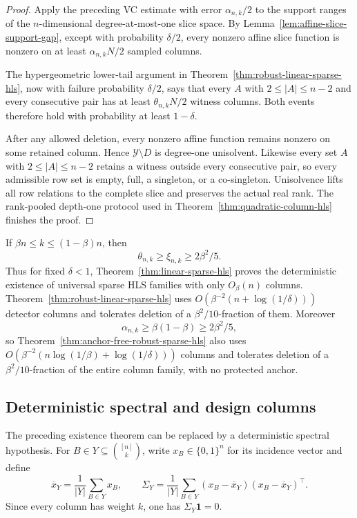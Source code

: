 \documentclass[11pt]{article}
\theoremstyle{definition}
\theoremstyle{remark}
\newcommand{\cY}{\mathcal Y}
\newcommand{\1}{\mathbf 1}
\begin{document}
\begin{proof}
Apply the preceding VC estimate with error $\alpha_{n,k}/2$ to the support
ranges of the $n$-dimensional degree-at-most-one slice space.  By
Lemma~\ref{lem:affine-slice-support-gap}, except with probability
$\delta/2$, every nonzero affine slice function is nonzero on at least
$\alpha_{n,k}N/2$ sampled columns.

The hypergeometric lower-tail argument in
Theorem~\ref{thm:robust-linear-sparse-hls}, now with failure probability
$\delta/2$, says that every $A$ with $2\le|A|\le n-2$ and every
consecutive pair has at least
$\theta_{n,k}N/2$ witness columns.  Both events therefore hold with
probability at least $1-\delta$.

After any allowed deletion, every nonzero affine function remains nonzero on
some retained column.  Hence $\cY\setminus D$ is degree-one unisolvent.
Likewise every set $A$ with $2\le|A|\le n-2$ retains a witness outside every consecutive
pair, so every admissible row set is empty, full, a singleton, or a
co-singleton.  Unisolvence lifts all row relations to the complete slice and
preserves the actual real rank.  The rank-pooled depth-one protocol used in
Theorem~\ref{thm:quadratic-column-hls} finishes the proof.
\end{proof}

If $\beta n\le k\le(1-\beta)n$, then
\[
 \theta_{n,k}\ge\xi_{n,k}\ge2\beta^2/5.
\]
Thus for fixed $\delta<1$, Theorem~\ref{thm:linear-sparse-hls} proves the
deterministic existence of universal sparse HLS families with only
$O_\beta(n)$ columns.
Theorem~\ref{thm:robust-linear-sparse-hls} uses
$O(\beta^{-2}(n+\log(1/\delta)))$ detector columns and tolerates deletion of
a $\beta^2/10$-fraction of them.
Moreover
\[
 \alpha_{n,k}\ge\beta(1-\beta)\ge2\beta^2/5,
\]
so Theorem~\ref{thm:anchor-free-robust-sparse-hls} also uses
$O(\beta^{-2}(n\log(1/\beta)+\log(1/\delta)))$ columns and tolerates deletion
of a $\beta^2/10$-fraction of the entire column family, with no protected
anchor.

\subsection{Deterministic spectral and design columns}

The preceding existence theorem can be replaced by a deterministic spectral
hypothesis.  For \(B\in Y\subseteq\binom{[n]}k\), write \(x_B\in\{0,1\}^n\)
for its incidence vector and define
\[
 \overline x_Y=\frac1{|Y|}\sum_{B\in Y}x_B,
 \qquad
 \Sigma_Y=\frac1{|Y|}\sum_{B\in Y}
 (x_B-\overline x_Y)(x_B-\overline x_Y)^\top .
\]
Since every column has weight \(k\), one has
\(\Sigma_Y\mathbf1=0\).
\end{document}
